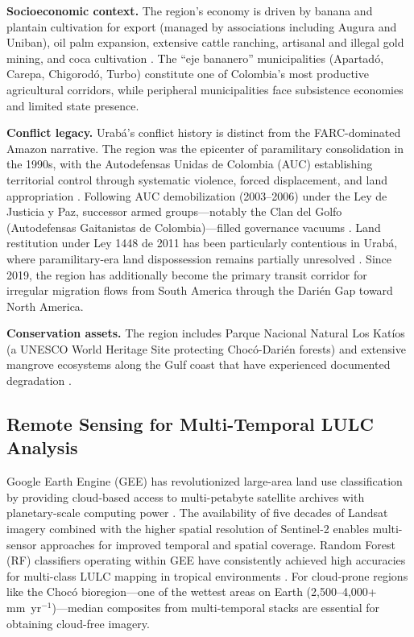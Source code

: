 \documentclass[12pt,a4paper]{article}
\begin{document}
\textbf{Socioeconomic context.} The region's economy is driven by banana and plantain cultivation for export (managed by associations including Augura and Uniban), oil palm expansion, extensive cattle ranching, artisanal and illegal gold mining, and coca cultivation \citep{Castiblanco2013}. The ``eje bananero'' municipalities (Apartad\'{o}, Carepa, Chigorod\'{o}, Turbo) constitute one of Colombia's most productive agricultural corridors, while peripheral municipalities face subsistence economies and limited state presence.

\textbf{Conflict legacy.} Urab\'{a}'s conflict history is distinct from the FARC-dominated Amazon narrative. The region was the epicenter of paramilitary consolidation in the 1990s, with the Autodefensas Unidas de Colombia (AUC) establishing territorial control through systematic violence, forced displacement, and land appropriation \citep{GarciaDeLaTorre2011,Uribe2001,GutierrezSanin2014}. Following AUC demobilization (2003--2006) under the Ley de Justicia y Paz, successor armed groups---notably the Clan del Golfo (Autodefensas Gaitanistas de Colombia)---filled governance vacuums \citep{Grajales2011,Grajales2015}. Land restitution under Ley 1448 de 2011 has been particularly contentious in Urab\'{a}, where paramilitary-era land dispossession remains partially unresolved \citep{SanchezGomez2020,Thomson2011}. Since 2019, the region has additionally become the primary transit corridor for irregular migration flows from South America through the Dari\'{e}n Gap toward North America.

\textbf{Conservation assets.} The region includes Parque Nacional Natural Los Kat\'{i}os (a UNESCO World Heritage Site protecting Choc\'{o}-Dari\'{e}n forests) and extensive mangrove ecosystems along the Gulf coast that have experienced documented degradation \citep{BlancoLibreros2015,Estrada2014,Polidoro2010}.

\subsection{Remote Sensing for Multi-Temporal LULC Analysis}

Google Earth Engine (GEE) has revolutionized large-area land use classification by providing cloud-based access to multi-petabyte satellite archives with planetary-scale computing power \citep{Gorelick2017}. The availability of five decades of Landsat imagery \citep{Wulder2022} combined with the higher spatial resolution of Sentinel-2 \citep{Drusch2012} enables multi-sensor approaches for improved temporal and spatial coverage. Random Forest (RF) classifiers \citep{Breiman2001} operating within GEE have consistently achieved high accuracies for multi-class LULC mapping in tropical environments \citep{Phalke2020,Zhang2023}. For cloud-prone regions like the Choc\'{o} bioregion---one of the wettest areas on Earth (2,500--4,000+ mm~yr$^{-1}$)---median composites from multi-temporal stacks are essential for obtaining cloud-free imagery.
\end{document}
